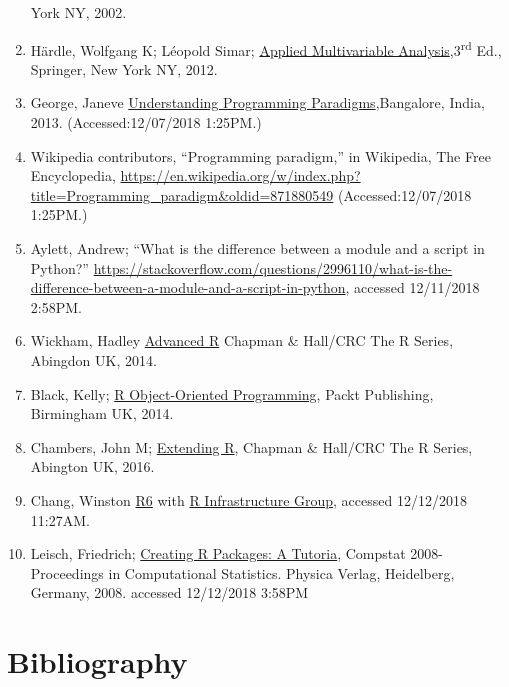 \documentclass[]{book}
\theoremstyle{definition}
\theoremstyle{definition}
\theoremstyle{definition}
\theoremstyle{remark}
\begin{document}
\begin{enumerate}
  York NY, 2002.
\item
  Härdle, Wolfgang K; Léopold Simar;
  \href{http://pascal.upf.edu/am/dades/h-s-mva-book/mvahtml.html}{Applied
  Multivariable Analysis},3\textsuperscript{rd} Ed., Springer, New York
  NY, 2012.
\item
  George, Janeve
  \href{http://www.janeve.me/software-programming/understanding-programming-paradigms}{Understanding
  Programming Paradigms},Bangalore, India, 2013. (Accessed:12/07/2018
  1:25PM.)
\item
  Wikipedia contributors, ``Programming paradigm,'' in Wikipedia, The
  Free Encyclopedia,
  \url{https://en.wikipedia.org/w/index.php?title=Programming_paradigm\&oldid=871880549}
  (Accessed:12/07/2018 1:25PM.)
\item
  Aylett, Andrew; ``What is the difference between a module and a script
  in Python?''
  \url{https://stackoverflow.com/questions/2996110/what-is-the-difference-between-a-module-and-a-script-in-python},
  accessed 12/11/2018 2:58PM.
\item
  Wickham, Hadley \href{https://adv-r.hadley.nz/index.html}{Advanced R}
  Chapman \& Hall/CRC The R Series, Abingdon UK, 2014.
\item
  Black, Kelly;
  \href{https://smile.amazon.com/R-Object-oriented-Programming-Kelly-Black-ebook/dp/B00OYTCJQG/ref=sr_1_1?ie=UTF8\&qid=1544629643\&sr=8-1\&keywords=Packt+R+Object-Oriented}{R
  Object-Oriented Programming}, Packt Publishing, Birmingham UK, 2014.
\item
  Chambers, John M;
  \href{https://smile.amazon.com/Extending-Chapman-Hall-John-Chambers-ebook/dp/B01GRHCLG0/ref=mt_kindle?_encoding=UTF8\&me=\&qid=1544629533}{Extending
  R}, Chapman \& Hall/CRC The R Series, Abington UK, 2016.
\item
  Chang, Winston \href{https://r6.r-lib.org/}{R6} with
  \href{https://github.com/r-lib}{R Infrastructure Group}, accessed
  12/12/2018 11:27AM.
\item
  Leisch, Friedrich;
  \href{https://cran.r-project.org/doc/contrib/Leisch-CreatingPackages.pdf}{Creating
  R Packages: A Tutoria}, Compstat 2008-Proceedings in Computational
  Statistics. Physica Verlag, Heidelberg, Germany, 2008. accessed
  12/12/2018 3:58PM
\end{enumerate}

\chapter{Bibliography}\label{bibliography}
\end{document}
